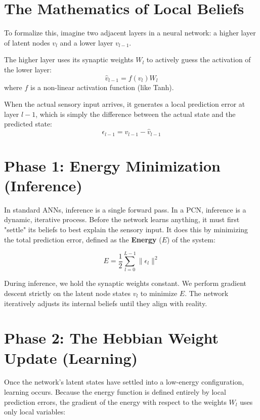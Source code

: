 \documentclass[12pt]{article}
\begin{document}
\section*{The Mathematics of Local Beliefs}

To formalize this, imagine two adjacent layers in a neural network: a higher layer of latent nodes $v_{l}$ and a lower layer $v_{l-1}$. 

The higher layer uses its synaptic weights $W_l$ to actively guess the activation of the lower layer:
\begin{equation}
    \hat{v}_{l-1} = f(v_l) W_l
\end{equation}
where $f$ is a non-linear activation function (like Tanh).

When the actual sensory input arrives, it generates a local prediction error at layer $l-1$, which is simply the difference between the actual state and the predicted state:
\begin{equation}
    \epsilon_{l-1} = v_{l-1} - \hat{v}_{l-1}
\end{equation}

\section*{Phase 1: Energy Minimization (Inference)}

In standard ANNs, inference is a single forward pass. In a PCN, inference is a dynamic, iterative process. Before the network learns anything, it must first "settle" its beliefs to best explain the sensory input. It does this by minimizing the total prediction error, defined as the \textbf{Energy} ($E$) of the system:

\begin{equation}
    E = \frac{1}{2} \sum_{l=0}^{L-1} \| \epsilon_l \|^2
\end{equation}

During inference, we hold the synaptic weights constant. We perform gradient descent strictly on the latent node states $v_l$ to minimize $E$. The network iteratively adjusts its internal beliefs until they align with reality.

\section*{Phase 2: The Hebbian Weight Update (Learning)}

Once the network's latent states have settled into a low-energy configuration, learning occurs. Because the energy function is defined entirely by local prediction errors, the gradient of the energy with respect to the weights $W_l$ uses only local variables:
\end{document}
